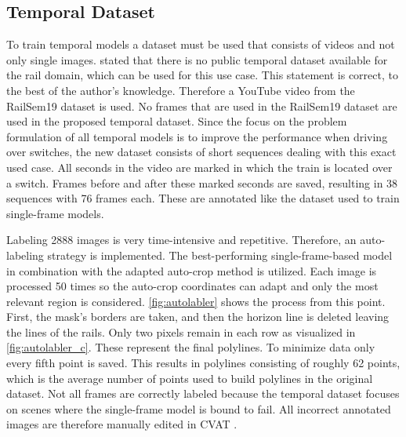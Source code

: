\subsection{Temporal Dataset}
\label{sec:tempDataset}

To train temporal models a dataset must be used that consists of videos and not only single images.
\cite{tepNet2024} stated that there is no public temporal dataset available for the rail domain, which can be used for this use case.
This statement is correct, to the best of the author's knowledge.
Therefore a YouTube video \cite{temporalDataset_youtube_video} from the RailSem19 dataset is used.
No frames that are used in the RailSem19 dataset are used in the proposed temporal dataset.
Since the focus on the problem formulation of all temporal models is to improve the performance when driving over switches, the new dataset consists of short sequences dealing with this exact used case.
All seconds in the video \cite{temporalDataset_youtube_video} are marked in which the train is located over a switch.
Frames before and after these marked seconds are saved, resulting in 38 sequences with 76 frames each. These are annotated like the dataset used to train single-frame models.

Labeling 2888 images is very time-intensive and repetitive.
Therefore, an auto-labeling strategy is implemented.
The best-performing single-frame-based model in combination with the adapted auto-crop method is utilized.
Each image is processed 50 times so the auto-crop coordinates can adapt and only the most relevant region is considered.
\autoref{fig:autolabler} shows the process from this point.
First, the mask's borders are taken, and then the horizon line is deleted leaving the lines of the rails.
Only two pixels remain in each row as visualized in \autoref{fig:autolabler_c}.
These represent the final polylines. To minimize data only every fifth point is saved.
This results in polylines consisting of roughly 62 points, which is the average number of points used to build polylines in the original dataset.
Not all frames are correctly labeled because the temporal dataset focuses on scenes where the single-frame model is bound to fail.
All incorrect annotated images are therefore manually edited in CVAT \cite{cvat}.

